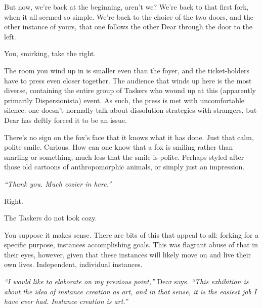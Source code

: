 \newpage
\null
\newpage
\null
\newpage

\null
\vfill

But now, we're back at the beginning, aren't we? We're back to that first fork, when it all seemed so simple. We're back to the choice of the two doors, and the other instance of yours, that one follows the other Dear through the door to the left.

You, smirking, take the right.

The room you wind up in is smaller even than the foyer, and the ticket-holders have to press even closer together. The audience that winds up here is the most diverse, containing the entire group of Taskers who wound up at this (apparently primarily Dispersionista) event. As such, the press is met with uncomfortable silence: one doesn't normally talk about dissolution strategies with strangers, but Dear has deftly forced it to be an issue.

There's no sign on the fox's face that it knows what it has done. Just that calm, polite smile. Curious. How can one know that a fox is smiling rather than snarling or something, much less that the smile is polite. Perhaps styled after those old cartoons of anthropomorphic animals, or simply just an impression.

\emph{``Thank you. Much cozier in here.''}

\vfill

\newpage

\null
\vfill

Right.

\null
\vfill

\begin{flushright}
  {\footnotesize The Taskers do not look cozy.}
\end{flushright}

\newpage

\null
\vfill

You suppose it makes sense. There are bits of this that appeal to all: forking for a specific purpose, instances accomplishing goals. This was flagrant abuse of that in their eyes, however, given that these instances will likely move on and live their own lives. Independent, individual instances.

\emph{``I would like to elaborate on my previous point,''} Dear says. \emph{``This exhibition is about the idea of instance creation as art, and in that sense, it is the easiest job I have ever had. Instance creation is art.''}

